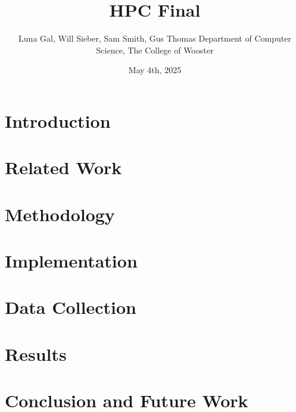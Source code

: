 \documentclass[12pt]{article}
\title{HPC Final}
\date{May 4th, 2025}
\author{\parbox{\linewidth}{\centering%
    Luna Gal, Will Sieber, Sam Smith, Gus Thomas
	\endgraf\bigskip
	Department of Computer Science, The College of Wooster
	\bigskip
}}
\begin{document}
\maketitle

\newpage
\tableofcontents
\newpage

\section{Introduction}

\section{Related Work}

\section{Methodology}

\section{Implementation}

\section{Data Collection}

\section{Results}

\section{Conclusion and Future Work}

\newpage
%
%
\end{document}
